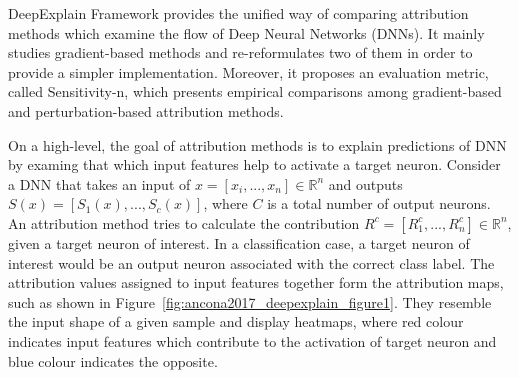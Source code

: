 \documentclass[english]{tktltiki2}
\theoremstyle{definition}
\theoremstyle{remark}
\begin{document}
DeepExplain Framework \citep{ancona2017towards} provides the unified way of comparing attribution methods which examine the flow of Deep Neural Networks (DNNs). It mainly studies gradient-based methods \citep{simonyan2013deep, shrikumar2016not, bach2015pixel, sundararajan2017axiomatic, shrikumar2017learning} and re-reformulates two of them \citep{bach2015pixel, shrikumar2017learning} in order to provide a simpler implementation. Moreover, it proposes an evaluation metric, called Sensitivity-n, which presents empirical comparisons among gradient-based and perturbation-based \citep{zeiler2014visualizing} attribution methods. 




On a high-level, the goal of attribution methods is to explain predictions of DNN by examing that which input features help to activate a target neuron. Consider a DNN that takes an input of $x = [x_i, ..., x_n] \in \mathbb{R}^n$ and outputs $S(x) = \left[S_{1}(x), ..., S_{c}(x)\right]$, where $C$ is a total number of output neurons. An attribution method tries to calculate the contribution $R^c = \left[R_{1}^c, ..., R_{n}^c\right] \in \mathbb{R}^n$, given a target neuron of interest. In a classification case, a target neuron of interest would be an output neuron associated with the correct class label. The attribution values assigned to input features together form the attribution maps, such as shown in Figure~\ref{fig:ancona2017_deepexplain_figure1}. They resemble the input shape of a given sample and display heatmaps, where red colour indicates input features which contribute to the activation of target neuron and blue colour indicates the opposite.
\end{document}
